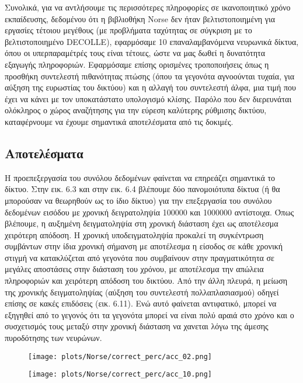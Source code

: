 \documentclass[12pt]{report}
\begin{document}
Συνολικά, για να αντλήσουμε τις περισσότερες πληροφορίες σε ικανοποιητικό χρόνο εκπαίδευσης, δεδομένου ότι η βιβλιοθήκη \textlatin{Norse} δεν ήταν βελτιστοποιημένη για εργασίες τέτοιου μεγέθους (με προβλήματα ταχύτητας σε σύγκριση με το βελτιστοποιημένο \textlatin{DECOLLE}), εφαρμόσαμε 10 επαναλαμβανόμενα νευρωνικά δίκτυα, όπου οι υπερπαραμέτρές τους είναι τέτοιες, ώστε να μας δωθεί η δυνατότητα εξαγωγής πληροφοριών. Εφαρμόσαμε επίσης ορισμένες τροποποιήσεις όπως η προσθήκη συντελεστή πιθανότητας πτώσης (όπου τα γεγονότα αγνοούνται τυχαία, για αύξηση της ευρωστίας του δικτύου) και η αλλαγή του συντελεστή άλφα, μια τιμή που έχει να κάνει με τον υποκατάστατο υπολογισμό κλίσης. Παρόλο που δεν διερευνάται ολόκληρος ο χώρος αναζήτησης για την εύρεση καλύτερης ρύθμισης δικτύου, καταφέρνουμε να έχουμε σημαντικά αποτελέσματα από τις δοκιμές.

\subsection{Αποτελέσματα}

Η προεπεξεργασία του συνόλου δεδομένων φαίνεται να επηρεάζει σημαντικά το δίκτυο. Στην εικ. 6.3 και στην εικ. 6.4 βλέπουμε δύο πανομοιότυπα δίκτυα (ή θα μπορούσαν να θεωρηθούν ως το ίδιο δίκτυο) για την επεξεργασία του συνόλου δεδομένων εισόδου με χρονική δειγρατοληψία 100000 και 1000000 αντίστοιχα. Όπως βλέπουμε, η αυξημένη δειγματοληψία στη χρονική διάσταση έχει ως αποτέλεσμα χειρότερη απόδοση. Η χρονική υποδειγματοληψία προκαλεί τη συγκέντρωση συμβάντων στην ίδια χρονική σήμανση με αποτέλεσμα η είσοδος σε κάθε χρονική στιγμή να κατακλύζεται από γεγονότα που συμβαίνουν στην πραγματικότητα σε μεγάλες αποστάσεις στην διάσταση του χρόνου, με αποτέλεσμα την απώλεια πληροφοριών και χειρότερη απόδοση του δικτύου. Από την άλλη πλευρά, η μείωση της χρονικής δειγματοληψίας (αύξηση του συντελεστή πολλαπλασιασμού) οδηγεί επίσης σε κακές επιδόσεις (εικ. 6.11). Ενώ αυτό φαίνεται αντιφατικό, μπορεί να εξηγηθεί από το γεγονός ότι τα γεγονότα μπορεί να είναι πολύ αραιά στο χρόνο και ο συσχετισμός τους μεταξύ στην χρονική διάσταση να χανεται λόγω της άμεσης πυροδότησης των νευρώνων.

\begin{figure}
\centering
\begin{minipage}{.4\textwidth}
  \centering
  \texttt{[image: plots/Norse/correct\_perc/acc\_02.png]}
  \label{fig:test1}
\end{minipage}
\begin{minipage}{.4\textwidth}
  \centering
  \texttt{[image: plots/Norse/correct\_perc/acc\_10.png]}
  \label{fig:test2}
\end{minipage}
\end{figure}
\end{document}

